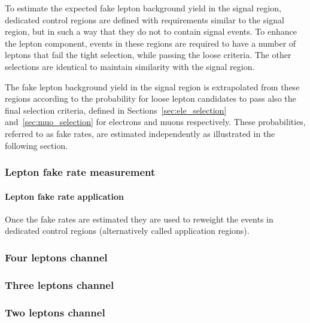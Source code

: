 \label{sec:fake_leptons}
To estimate the expected fake lepton background yield in the signal region,
dedicated control regions are defined with requirements similar to the signal region, but in such a way that they do not to contain signal events.
To enhance the \nonprompt lepton component, events in these regions are required to
have a number of leptons that fail the tight selection, while passing the loose criteria.
The other selections are identical to maintain similarity with the signal region.

The fake lepton background yield in the signal region is extrapolated from these regions
according to the probability for loose lepton candidates to pass also the final selection criteria,
defined in Sections~\ref{sec:ele_selection} and~\ref{sec:muo_selection} for electrons and muons respectively.
These probabilities, referred to as fake rates, are estimated independently as illustrated in the following section.

\subsubsection{Lepton fake rate measurement}


\paragraph{Lepton fake rate application\\}
Once the fake rates are estimated they are used to reweight the events
in dedicated control regions (alternatively called application regions).

\subsubsection{Four leptons channel}


\subsubsection{Three leptons channel}


\subsubsection{Two leptons channel}


